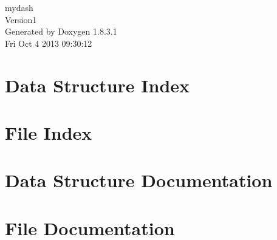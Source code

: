 \documentclass{book}
\begin{document}
\hypersetup{pageanchor=false,citecolor=blue}
\begin{titlepage}
\vspace*{7cm}
\begin{center}
{\Large mydash \\[1ex]\large Version1 }\\
\vspace*{1cm}
{\large Generated by Doxygen 1.8.3.1}\\
\vspace*{0.5cm}
{\small Fri Oct 4 2013 09:30:12}\\
\end{center}
\end{titlepage}
\clearemptydoublepage
{}
\tableofcontents
\clearemptydoublepage
{}
\hypersetup{pageanchor=true,citecolor=blue}
\chapter{Data Structure Index}

\chapter{File Index}

\chapter{Data Structure Documentation}



\chapter{File Documentation}












\printindex
\end{document}
